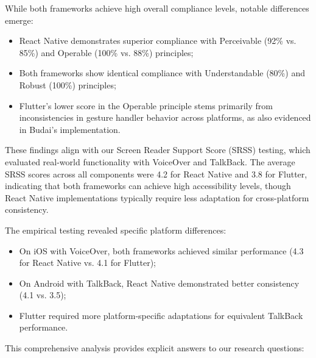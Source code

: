 While both frameworks achieve high overall compliance levels, notable differences emerge:

\begin{itemize}
    \item React Native demonstrates superior compliance with Perceivable (92\% vs. 85\%) and Operable (100\% vs. 88\%) principles;
    \item Both frameworks show identical compliance with Understandable (80\%) and Robust (100\%) principles;
    \item Flutter's lower score in the Operable principle stems primarily from inconsistencies in gesture handler behavior across platforms, as also evidenced in Budai's implementation.
\end{itemize}

These findings align with our Screen Reader Support Score (SRSS) testing, which evaluated real-world functionality with VoiceOver and TalkBack. The average SRSS scores across all components were 4.2 for React Native and 3.8 for Flutter, indicating that both frameworks can achieve high accessibility levels, though React Native implementations typically require less adaptation for cross-platform consistency.

The empirical testing revealed specific platform differences:

\begin{itemize}
    \item On iOS with VoiceOver, both frameworks achieved similar performance (4.3 for React Native vs. 4.1 for Flutter);
    \item On Android with TalkBack, React Native demonstrated better consistency (4.1 vs. 3.5);
    \item Flutter required more platform-specific adaptations for equivalent TalkBack performance.
\end{itemize}

This comprehensive analysis provides explicit answers to our research questions:

